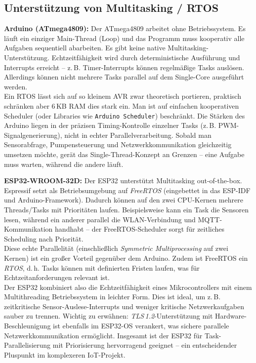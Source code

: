 \subsection{Unterstützung von Multitasking / RTOS}

\textbf{Arduino (ATmega4809):} Der ATmega4809 arbeitet ohne Betriebssystem. Es läuft ein einziger Main-Thread (Loop) und das Programm muss kooperativ alle Aufgaben sequentiell abarbeiten. Es gibt keine native Multitasking-Unterstützung. Echtzeitfähigkeit wird durch deterministische Ausführung und Interrupts erreicht – z.\,B. Timer-Interrupts können regelmäßige Tasks auslösen. Allerdings können nicht mehrere Tasks parallel auf dem Single-Core ausgeführt werden. 
\\
Ein RTOS lässt sich auf so kleinem AVR zwar theoretisch portieren, praktisch schränken aber 6\,KB RAM dies stark ein. Man ist auf einfachen kooperativen Scheduler (oder Libraries wie \texttt{Arduino Scheduler}) beschränkt. Die Stärken des Arduino liegen in der präzisen Timing-Kontrolle einzelner Tasks (z.\,B. PWM-Signalgenerierung), nicht in echter Parallelverarbeitung. \autocite{esp32_comparison} Sobald man Sensorabfrage, Pumpensteuerung und Netzwerkkommunikation gleichzeitig umsetzen möchte, gerät das Single-Thread-Konzept an Grenzen – eine Aufgabe muss warten, während die andere läuft.

\vspace{5mm}

\noindent\textbf{ESP32-WROOM-32D:} Der ESP32 unterstützt Multitasking out-of-the-box. Espressif setzt als Betriebsumgebung auf \textit{FreeRTOS} (eingebettet in das ESP-IDF und Arduino-Framework). \autocite{esp_datasheet} Dadurch können auf den zwei CPU-Kernen mehrere Threads/Tasks mit Prioritäten laufen. Beispielsweise kann ein Task die Sensoren lesen, während ein anderer parallel die WLAN-Verbindung und MQTT-Kommunikation handhabt – der FreeRTOS-Scheduler sorgt für zeitliches Scheduling nach Priorität. 
\\
Diese echte Parallelität (einschließlich \textit{Symmetric Multiprocessing} auf zwei Kernen) ist ein großer Vorteil gegenüber dem Arduino. Zudem ist FreeRTOS ein \textit{RTOS}, d.\,h. Tasks können mit definierten Fristen laufen, was für Echtzeitanforderungen relevant ist. 
\\
Der ESP32 kombiniert also die Echtzeitfähigkeit eines Mikrocontrollers mit einem Multithreading Betriebssystem in leichter Form. Dies ist ideal, um z.\,B. zeitkritische Sensor-Auslese-Interrupts und weniger kritische Netzwerkaufgaben sauber zu trennen. Wichtig zu erwähnen: \textit{TLS\,1.2}-Unterstützung mit Hardware-Beschleunigung ist ebenfalls im ESP32-OS verankert, \autocite{esp_datasheet} was sichere parallele Netzwerkkommunikation ermöglicht. Insgesamt ist der ESP32 für Task-Parallelisierung mit Priorisierung hervorragend geeignet – ein entscheidender Pluspunkt im komplexeren IoT-Projekt.


